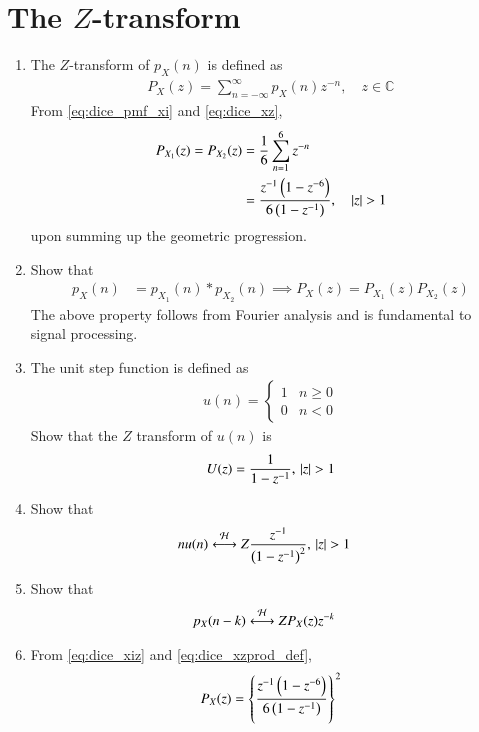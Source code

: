 \documentclass[journal,12pt,twocolumn]{IEEEtran}
\renewcommand\thesection{\arabic{section}}
\begin{document}
\section{The $Z$-transform }
\begin{enumerate}[label=\thesection.\arabic*.,ref=\thesection.\theenumi]
\item 
The $Z$-transform of $p_X(n)$ is defined as 
\begin{align}
P_X(z) = \sum_{n = -\infty}^{\infty}p_X(n)z^{-n}, \quad z \in \mathbb{C}
\label{eq:dice_xz}
\end{align}
%
From \eqref{eq:dice_pmf_xi} and \eqref{eq:dice_xz}, 
\begin{align}
P_{X_1}(z) =P_{X_2}(z) &= \frac{1}{6}\sum_{n = 1}^{6}z^{-n}
\\
&=\frac{z^{-1}\brak{1-z^{-6}}}{6\brak{1-z^{-1}}}, \quad \abs{z} > 1
\label{eq:dice_xiz}
\end{align}
upon summing up the geometric progression.  
\item Show that 
\begin{align}
p_X(n) &= p_{X_1}(n)*p_{X_2}(n)
\implies
P_X(z) = P_{X_1}(z)P_{X_2}(z)
\label{eq:dice_xzprod_def}
\end{align}
The above property follows from Fourier analysis and is fundamental to signal processing. 
\item The unit step function is defined as
\begin{align}
u(n) =
\begin{cases}
1 & n \ge 0
\\
0 & n < 0
\end{cases}
\end{align}
		Show that the $Z$ transform of $u(n)$ is 
\begin{align}
	U(z) = \frac{1}{1-z^{-1}},\,\left\vert z\right\vert > 1
\end{align}
\item Show that
\begin{align}
\label{eq:dice-ramp}
	nu(n)&\system{Z} \frac{z^{-1}}{\brak{1-z^{-1}}^2},\,
\abs{z} > 1
\end{align}
\item Show that 
\begin{align}
\label{eq:dice-delay}
	p_X(n-k) &\system{Z}P_X(z)z^{-k}
\end{align}
\item From \eqref{eq:dice_xiz} and \eqref{eq:dice_xzprod_def},
\begin{align}
P_X(z) = \cbrak{\frac{z^{-1}\brak{1-z^{-6}}}{6\brak{1-z^{-1}}}}^2

\end{align}
\end{enumerate}
\end{document}
